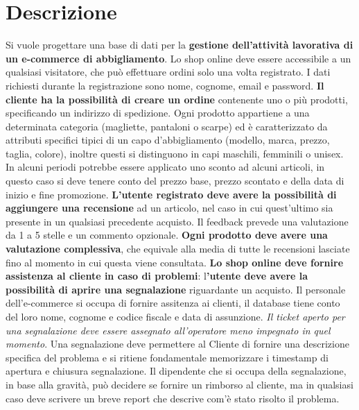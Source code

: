 \section{Descrizione}

Si vuole progettare una base di dati per la\textbf{ gestione dell'attività lavorativa di un e-commerce di abbigliamento}. Lo shop online deve essere accessibile a un qualsiasi visitatore, che può effettuare ordini solo una volta registrato. I dati richiesti durante la registrazione sono nome, cognome, email e password. \textbf{Il cliente ha la possibilità di creare un ordine} contenente uno o più prodotti, specificando un indirizzo di spedizione. Ogni prodotto appartiene a una determinata categoria (magliette, pantaloni o scarpe) ed è caratterizzato da attributi specifici tipici di un capo d'abbigliamento (modello, marca, prezzo, taglia, colore), inoltre questi si distinguono in capi maschili, femminili o unisex. In alcuni periodi potrebbe essere applicato uno sconto ad alcuni articoli, in questo caso si deve tenere conto del prezzo base, prezzo scontato e della data di inizio e fine promozione.
\textbf{L'utente registrato deve avere la possibilità di aggiungere una recensione} ad un articolo, nel caso in cui quest'ultimo sia presente in un qualsiasi precedente acquisto. Il feedback prevede una valutazione da 1 a 5 stelle e un commento opzionale. \textbf{Ogni prodotto deve avere una valutazione complessiva}, che equivale alla media di tutte le recensioni lasciate fino al momento in cui questa viene consultata.
\textbf{Lo shop online deve fornire assistenza al cliente in caso di problemi}: l\textbf{'utente deve avere la possibilità di aprire una segnalazione} riguardante un acquisto. Il personale dell'e-commerce si occupa di fornire assitenza ai clienti, il database tiene conto del loro nome, cognome e codice fiscale e data di assunzione.\textit{ Il ticket aperto per una segnalazione deve essere assegnato all'operatore meno impegnato in quel momento}. Una segnalazione deve permettere al Cliente di fornire una descrizione specifica del problema e si ritiene fondamentale memorizzare i timestamp di apertura e chiusura segnalazione. Il dipendente che si occupa della segnalazione, in base alla gravità, può decidere se fornire un rimborso al cliente, ma in qualsiasi caso deve scrivere un breve report che descrive com'è stato risolto il problema.
\newpage
